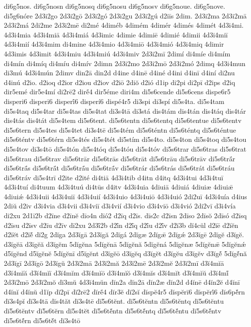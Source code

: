 {di6g5nos.
di6g5nosn
di6g5nosq
di6g5nosu
di6g5nosv
di6g5noue.
di6g5nove.
di5g6nóre
2d3i2go
2d3i2gō
2d3i2gó
2d3i2gu
2d3i2gú
d2iīs
2dim.
2d3i2ma
2d3i2mā
2d3i2má
2di2me
2d3i2mē
di2mé
4diméb
4dimém
4dimér
4dimés
4dimét
4d3i4mi.
4d3i4mia
4d3i4miā
4d3i4miá
4d3imic
4dimie
4dimiē
4dimié
4dimii
4d3i4miī
4d3i4mií
4d3i4mim
di4mine
4d3i4mio
4d3i4miō
4d3i4mió
4d3i4miq
4dimir
4d3imis
4d3imit
4d3i4miu
4d3i4miú
4d3i4miv
2d3i2mī
2dimí
di4míe
di4mím
di4mín
di4míq
di4míu
di4mív
2dimn
2d3i2mo
2d3i2mō
2d3i2mó
2dimq
4d3i4mun
di3mú
4d3i4mún
2dimv
din2ā
din2d
d4ine
d4inē
d4iné
d4ini
d4inī
d4iní
di2nu
d4inú
d2io.
d2ioq
d2ior
d2iou
d2iov
d2iō
2diŏ
d2ió
d1ip
di2pi
di2pī
d2ips
d2iq
dir5emé
dir5e4mí
di2rē2
dirḗ4
dir5éme
diri4m
di5s6cende
di5s6cens
dispe6r5
disperi6
disperī6
disperī́6
disperí6
dispé4r5
di3spi
di3spí
di5s4ta.
di5s4tam
di5s4taq
di5s4tar
di5s4tas
di5s4tat
di3s4tā
di3stá
dis4tám
dis4tán
dis4táq
dis4tár
dis4tás
dis4tát
di5s4tem
di5s6tent.
di5s6tentn
di5s6tentq
di5s6tentue
di5s6tentv
di5s6tern
di5s4tes
di5s4tet
di3s4tē
di5s4tém
di5s6téntn
di5s6téntq
di5s6téntue
di5s6téntv
di5s6térn
di5s4tés
di5s4tét
di5stím
di5s4to.
di5s4ton
di5s4toq
di5s4tou
di5s4tov
di3s4tō
di5s4tón
di5s4tóq
di5s4tóu
di5s4tóv
di5s6trar
di5s6tras
di5s6trat
di5s6trau
di5s6trav
di5s6trār
di5s6trās
di5s6trāt
di5s6trāu
di5s6trāv
di5s6trā́r
di5s6trā́s
di5s6trā́t
di5s6trā́u
di5s6trā́v
di5s6trár
di5s6trás
di5s6trát
di5s6tráu
di5s6tráv
di5s4trī
d2ite
d2ité
di4tiā
4d3i4tib
d4itn
d4itq
4d3i4tui
4d3i4tuī
4d3i4tuí
di4tuum
4d3i4tuú
di4tūs
d4itv
4d3i4uia
4diuiā
4diuiá
4diuiæ
4diuiǣ
4diuiǽ
4d3i4uii
4d3i4uiī
4d3i4uií
4d3i4uio
4d3i4uiō
4d3i4uió
2di2uī
4d3i4uía
d4ius
2diŭ
d2iv
d3i4via
d3i4vii
d3i4viī
d3i4vií
d3i4vio
d3i4viō
d3i4vió
2di2vī
d3i4vía
di2xu
2d1ī2b
d2īne
d2īnĕ
dīo4n
dīó2
d2īq
d2īs.
dīs2c
d2īsn
2dīso
2dīsŏ
2dīsó
d2īsq
d2īsu
d2īsv
d2īu
d2īv
dī2xu
2d3ī́2b
d2ī́n
d2ī́q
d2ī́u
d2ī́v
d2ĭ3b
dĭ4cŭl
d2ĭē
d2ĭĕn
d2ĭĕt
d2ĭĕ́
dĭ2g
2dĭga
2d3ĭgā
2d3ĭgă
2dĭgá
2dĭgæ
2dĭgǣ
2dĭgǽ
2d3ĭgē
2dĭgĕ
d3ĭgĕ.
d3ĭgĕā
d3ĭgĕă
d3ĭgĕm
5dĭgĕna
5dĭgĕnā
5dĭgĕnă
5dĭgĕná
5dĭgĕnæ
5dĭgĕnǣ
5dĭgĕnǽ
d5ĭgĕnd
d5ĭgĕnĕ
5dĭgĕnī
d5ĭgĕnt
d3ĭgĕō
d3ĭgĕq
d3ĭgĕt
d3ĭgĕu
d3ĭgĕv
d3ĭgĕ́
5dĭgĕ́nă
2d3ĭgī
2d3ĭgō
2d3ĭgŭ
2d3ĭ2mā
2d3ĭ2mă
2d3ĭ2mē
2d3ĭ2mĕ
2d3ĭ2mī
d3ĭ4mĭā
d3ĭ4mĭă
d3ĭ4mĭī
d3ĭ4mĭm
d3ĭ4mĭō
d3ĭ4mĭŏ
d3ĭ4mĭs
d3ĭ4mĭt
d3ĭ4mĭŭ
d3ĭ4mĭ́
2d3ĭ2mō
2d3ĭ2mŏ
dĭ3mŭ
4d3ĭ4mŭn
dĭn2a
dĭn2ā
dĭn2æ
dĭn2d
d4ĭnē
d4ĭn2ĕ
d4ĭnī
d4ĭnĭ
d4ĭnŭ
d1ĭp
dĭ2pī
dĭ2rē2
dĭrḗ4
dĭr3ĕ
dĭ2sĭ
dĭspĕ4r5
dĭspĕrī6
dĭspĕrī́6
dĭs6pĕ́rn
dĭ3s4pĭ
dĭ3s4tā
dĭs4tăt
dĭ3s4tē
dĭ5s6tĕnt.
dĭ5s6tĕntn
dĭ5s6tĕntq
dĭ5s6tĕntu
dĭ5s6tĕntv
dĭ5s6tĕrn
dĭ5s4tĕt
dĭ5s6tĕ́ntn
dĭ5s6tĕ́ntq
dĭ5s6tĕ́ntu
dĭ5s6tĕ́ntv
dĭ5s6tĕ́rn
dĭ5s6tĕ́t
dĭ3s4tō
}
